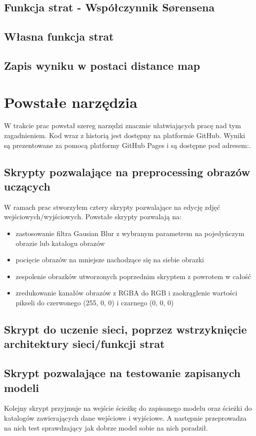 \documentclass{article}
\begin{document}
\subsection{Funkcja strat - Współczynnik Sørensena}
\subsection{Własna funkcja strat}
\subsection{Zapis wyniku w postaci distance map}
\newpage
\section{Powstałe narzędzia}
W trakcie prac powstał szereg narzędzi znacznie ułatwiających pracę nad tym zagadnieniem.
Kod wraz z historią jest dostępny na platformie GitHub.
Wyniki są prezentowane za pomocą platformy GitHub Pages i są dostępne pod adresem:.
\subsection{Skrypty pozwalające na preprocessing obrazów uczących}
W ramach prac stworzyłem cztery skrypty pozwalające na edycję zdjęć wejściowych/wyjściowych.
Powstałe skrypty pozwalają na:
\begin{itemize}
  \item zastosowanie filtra Gausian Blur z wybranym parametrem na pojedyńczym obrazie lub katalogu obrazów
  \item pocięcie obrazów na mniejsze nachodzące się na siebie obrazki
  \item zespolenie obrazków utworzonych poprzednim skryptem z powrotem w całość
  \item zredukowanie kanałów obrazów z RGBA do RGB i zaokrąglenie wartości pikseli do czerwonego (255, 0, 0) i czarnego (0, 0, 0)
\end{itemize}
\subsection{Skrypt do uczenie sieci, poprzez wstrzyknięcie architektury sieci/funkcji strat}
\subsection{Skrypt pozwalające na testowanie zapisanych modeli}
Kolejny skrypt przyjmuje na wejście ścieżkę do zapisanego modelu oraz ścieżki do katalogów zawierających dane wejściowe i wyjściowe.
A następnie przeprowadza na nich test sprawdzający jak dobrze model sobie na nich poradził.
\end{document}
